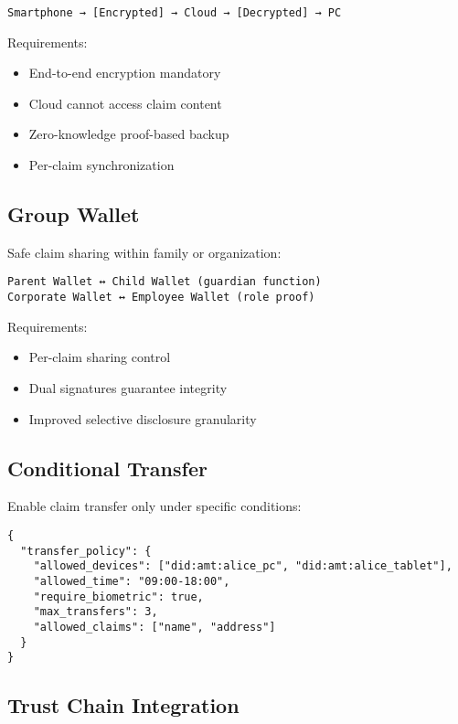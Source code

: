 \begin{verbatim}
Smartphone → [Encrypted] → Cloud → [Decrypted] → PC
\end{verbatim}

Requirements:
\begin{itemize}
  \item End-to-end encryption mandatory
  \item Cloud cannot access claim content
  \item Zero-knowledge proof-based backup
  \item Per-claim synchronization
\end{itemize}

\subsection{Group Wallet}

Safe claim sharing within family or organization:

\begin{verbatim}
Parent Wallet ↔ Child Wallet (guardian function)
Corporate Wallet ↔ Employee Wallet (role proof)
\end{verbatim}

Requirements:
\begin{itemize}
  \item Per-claim sharing control
  \item Dual signatures guarantee integrity
  \item Improved selective disclosure granularity
\end{itemize}

\subsection{Conditional Transfer}

Enable claim transfer only under specific conditions:

\begin{verbatim}
{
  "transfer_policy": {
    "allowed_devices": ["did:amt:alice_pc", "did:amt:alice_tablet"],
    "allowed_time": "09:00-18:00",
    "require_biometric": true,
    "max_transfers": 3,
    "allowed_claims": ["name", "address"]
  }
}
\end{verbatim}

\subsection{Trust Chain Integration}


